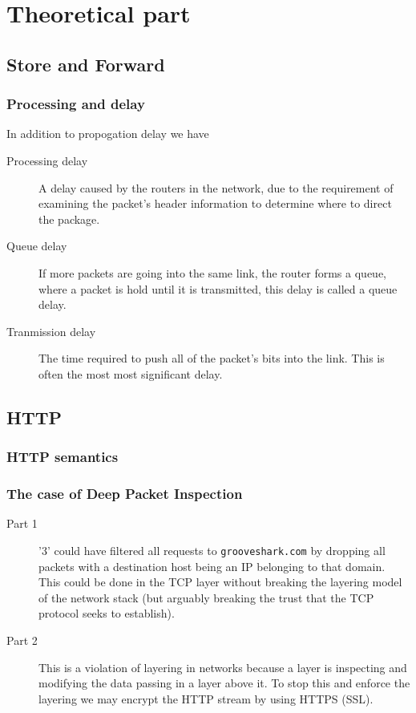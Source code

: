 \documentclass[a4paper]{article}
\begin{document}
\maketitle
\thispagestyle{first}
\newpage

\section{Theoretical part}
\subsection{Store and Forward}
\subsubsection{Processing and delay}
In addition to propogation delay we have

\begin{description}
    \item[Processing delay] A delay caused by the routers in the network,
        due to the requirement of examining the packet's header information to
        determine where to direct the package. 
    \item[Queue delay] If more packets are going into the same link, the
        router forms a queue, where a packet is hold until it is
        transmitted, this delay is called a queue delay.
    \item[Tranmission delay] The time required to push all of the packet's bits
        into the link. This is often the most most significant delay.
\end{description}

\subsection{HTTP}
\subsubsection{HTTP semantics}

\subsubsection{The case of Deep Packet Inspection}
\begin{description}
    \item[Part 1] '3' could have filtered all requests to \texttt{grooveshark.com} by dropping all packets
        with a destination host being an IP belonging to that domain. This could be done in the TCP layer without
        breaking the layering model of the network stack (but arguably breaking the trust that the TCP protocol
        seeks to establish).
    \item[Part 2] This is a violation of layering in networks because a layer is inspecting and modifying
        the data passing in a layer above it. To stop this and enforce the layering we may encrypt the HTTP
        stream by using HTTPS (SSL).
\end{description}
\end{document}
